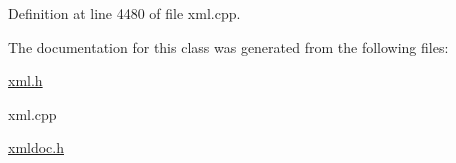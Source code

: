 Definition at line 4480 of file xml.cpp.



The documentation for this class was generated from the following files:\begin{DoxyCompactItemize}
\item 
\hyperlink{xml_8h}{xml.h}\item 
xml.cpp\item 
\hyperlink{xmldoc_8h}{xmldoc.h}\end{DoxyCompactItemize}
